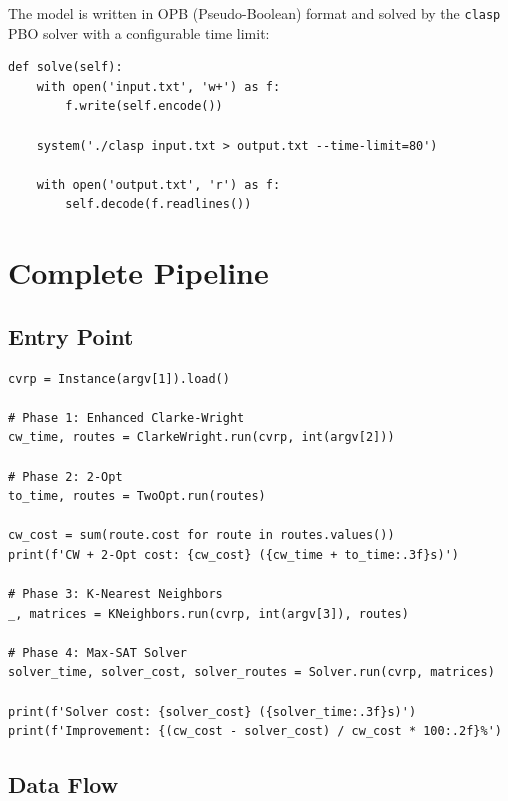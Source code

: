 \documentclass[12pt,a4paper]{article}
\theoremstyle{definition}
\begin{document}
The model is written in OPB (Pseudo-Boolean) format and solved by the \texttt{clasp} PBO solver with a configurable time limit:

\begin{lstlisting}[caption={Solver invocation}]
def solve(self):
    with open('input.txt', 'w+') as f:
        f.write(self.encode())
    
    system('./clasp input.txt > output.txt --time-limit=80')
    
    with open('output.txt', 'r') as f:
        self.decode(f.readlines())
\end{lstlisting}

\section{Complete Pipeline}

\subsection{Entry Point}

\begin{lstlisting}[caption={Main pipeline (run.py)}]
cvrp = Instance(argv[1]).load()

# Phase 1: Enhanced Clarke-Wright
cw_time, routes = ClarkeWright.run(cvrp, int(argv[2]))

# Phase 2: 2-Opt
to_time, routes = TwoOpt.run(routes)

cw_cost = sum(route.cost for route in routes.values())
print(f'CW + 2-Opt cost: {cw_cost} ({cw_time + to_time:.3f}s)')

# Phase 3: K-Nearest Neighbors
_, matrices = KNeighbors.run(cvrp, int(argv[3]), routes)

# Phase 4: Max-SAT Solver
solver_time, solver_cost, solver_routes = Solver.run(cvrp, matrices)

print(f'Solver cost: {solver_cost} ({solver_time:.3f}s)')
print(f'Improvement: {(cw_cost - solver_cost) / cw_cost * 100:.2f}%')
\end{lstlisting}

\subsection{Data Flow}
\end{document}
